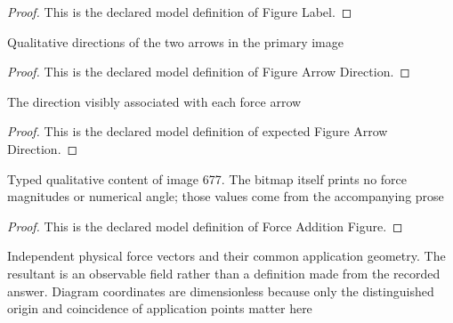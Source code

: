 \begin{proof}
  This is the declared model definition of Figure Label.
\end{proof}
\begin{definition}
  \label{def:physics:phyx-mini-0677:phyxminiproblems-problemphyxmini0677-figurearrowdirection}
  Qualitative directions of the two arrows in the primary image
\end{definition}
\begin{proof}
  This is the declared model definition of Figure Arrow Direction.
\end{proof}
\begin{definition}
  \label{def:physics:phyx-mini-0677:phyxminiproblems-problemphyxmini0677-expectedfigurearrowdirection}
  The direction visibly associated with each force arrow
\end{definition}
\begin{proof}
  This is the declared model definition of expected Figure Arrow Direction.
\end{proof}
\begin{definition}
  \label{def:physics:phyx-mini-0677:phyxminiproblems-problemphyxmini0677-forceadditionfigure}
  Typed qualitative content of image 677. The bitmap itself prints no force magnitudes or numerical angle; those values come from the accompanying prose
\end{definition}
\begin{proof}
  This is the declared model definition of Force Addition Figure.
\end{proof}
\begin{definition}
  \label{def:physics:phyx-mini-0677:phyxminiproblems-problemphyxmini0677-planarforceadditionsetup}
  Independent physical force vectors and their common application geometry. The resultant is an observable field rather than a definition made from the recorded answer. Diagram coordinates are dimensionless because only the distinguished origin and coincidence of application points matter here
\end{definition}
